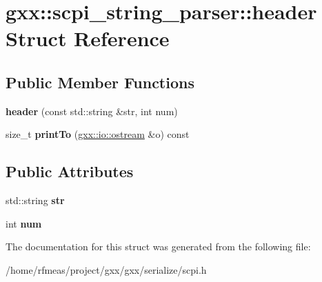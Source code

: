 \hypertarget{structgxx_1_1scpi__string__parser_1_1header}{}\section{gxx\+:\+:scpi\+\_\+string\+\_\+parser\+:\+:header Struct Reference}
\label{structgxx_1_1scpi__string__parser_1_1header}
\subsection*{Public Member Functions}
\begin{DoxyCompactItemize}
\item 
{\bfseries header} (const std\+::string \&str, int num)\hypertarget{structgxx_1_1scpi__string__parser_1_1header_a242f892b692f68e9465e8901d7e10ac2}{}\label{structgxx_1_1scpi__string__parser_1_1header_a242f892b692f68e9465e8901d7e10ac2}

\item 
size\+\_\+t {\bfseries print\+To} (\hyperlink{classgxx_1_1io_1_1ostream}{gxx\+::io\+::ostream} \&o) const \hypertarget{structgxx_1_1scpi__string__parser_1_1header_a77fc4fd31eb4b0e1c757d76b16d10072}{}\label{structgxx_1_1scpi__string__parser_1_1header_a77fc4fd31eb4b0e1c757d76b16d10072}

\end{DoxyCompactItemize}
\subsection*{Public Attributes}
\begin{DoxyCompactItemize}
\item 
std\+::string {\bfseries str}\hypertarget{structgxx_1_1scpi__string__parser_1_1header_a718ebe3935609a109d3072e28acb0f84}{}\label{structgxx_1_1scpi__string__parser_1_1header_a718ebe3935609a109d3072e28acb0f84}

\item 
int {\bfseries num}\hypertarget{structgxx_1_1scpi__string__parser_1_1header_a9a6525b0b8b23f7c99fc525073ed5d64}{}\label{structgxx_1_1scpi__string__parser_1_1header_a9a6525b0b8b23f7c99fc525073ed5d64}

\end{DoxyCompactItemize}


The documentation for this struct was generated from the following file\+:\begin{DoxyCompactItemize}
\item 
/home/rfmeas/project/gxx/gxx/serialize/scpi.\+h\end{DoxyCompactItemize}
